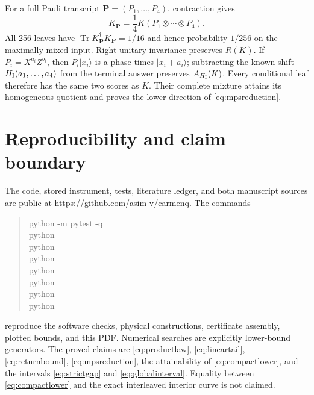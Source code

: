 \documentclass[10pt,twocolumn]{article}
\theoremstyle{remark}
\newcommand{\Tr}{\operatorname{Tr}}
\newcommand{\ket}[1]{\lvert #1\rangle}
\begin{document}
For a full Pauli transcript ${\bm P}=(P_1,\ldots,P_4)$, contraction gives
\begin{equation}
K_{\bm P}=\frac14K(P_1\otimes\cdots\otimes P_4).
\label{eq:covariantleaves}
\end{equation}
All 256 leaves have $
\Tr K_{\bm P}^\dagger K_{\bm P}=1/16$ and hence probability $1/256$ on
the maximally mixed input. Right-unitary invariance preserves $R(K)$. If
$P_i=X^{a_i}Z^{b_i}$, then $P_i\ket{x_i}$ is a phase times
$\ket{x_i+a_i}$; subtracting the known shift
$H_{\rm I}(a_1,\ldots,a_4)$ from the terminal answer preserves $A_{H_{\rm
I}}(K)$. Every conditional leaf therefore has the same two scores as $K$.
Their complete mixture attains its homogeneous quotient and proves the lower
direction of \eqref{eq:mpsreduction}.

\section{Reproducibility and claim boundary}

The code, stored instrument, tests, literature ledger, and both manuscript
sources are public at \url{https://github.com/asim-v/carmenq}. The commands
\begin{quote}\ttfamily\scriptsize
python -m pytest -q\\
python \\
python \\
python \\
python \\
python \\
python \\
python 
\end{quote}
reproduce the software checks, physical constructions, certificate assembly,
plotted bounds, and this PDF. Numerical searches are explicitly lower-bound
generators. The
proved claims are \eqref{eq:productlaw}, \eqref{eq:lineartail},
\eqref{eq:returnbound}, \eqref{eq:mpsreduction}, the attainability of
\eqref{eq:compactlower}, and the intervals \eqref{eq:strictgap} and
\eqref{eq:globalinterval}. Equality
between \eqref{eq:compactlower} and the exact interleaved interior curve is
not claimed.

\FloatBarrier

{\small}
\end{document}
